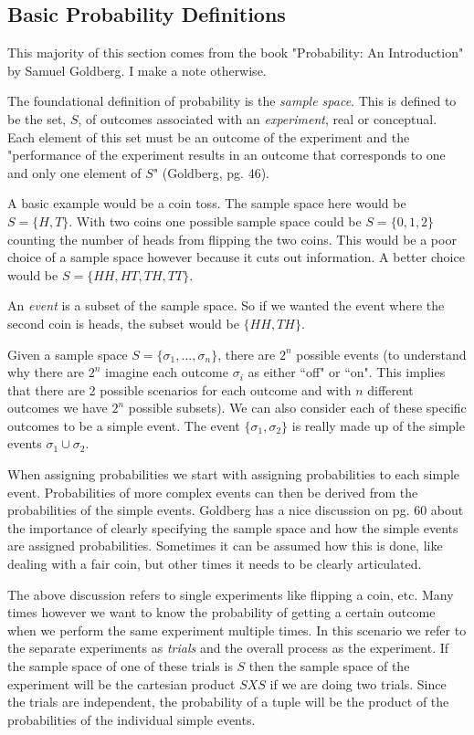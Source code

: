 \subsection{Basic Probability Definitions}

This majority of this section comes from the book "Probability: An Introduction" by Samuel Goldberg. I make a note otherwise.

The foundational definition of probability is the \emph{sample space}. This is defined to be the set, $S$, of outcomes associated with an \emph{experiment}, real or conceptual. Each element of this set must be an outcome of the experiment and the "performance of the experiment results in an outcome that corresponds to one and only one element of $S$" (Goldberg, pg. 46).

A basic example would be a coin toss. The sample space here would be $S = \{H,T\}$. With two coins one possible sample space could be $S=\{0,1,2\}$ counting the number of heads from flipping the two coins. This would be a poor choice of a sample space however because it cuts out information. A better choice would be $S=\{HH, HT, TH, TT\}$.

An \emph{event} is a subset of the sample space. So if we wanted the event where the second coin is heads, the subset would be $\{HH, TH\}$.

Given a sample space $S=\{\sigma_1, ..., \sigma_n\}$, there are $2^n$ possible events (to understand why there are $2^n$ imagine each outcome $\sigma_i$ as either ``off" or ``on". This implies that there are 2 possible scenarios for each outcome and with $n$ different outcomes we have $2^n$ possible subsets). We can also consider each of these specific outcomes to be a simple event. The event $\{\sigma_1, \sigma_2\}$ is really made up of the simple events ${\sigma_1} \cup {\sigma_2}$. 

When assigning probabilities we start with assigning probabilities to each simple event. Probabilities of more complex events can then be derived from the probabilities of the simple events. Goldberg has a nice discussion on pg. 60 about the importance of clearly specifying the sample space and how the simple events are assigned probabilities. Sometimes it can be assumed how this is done, like dealing with a fair coin, but other times it needs to be clearly articulated.

The above discussion refers to single experiments like flipping a coin, etc. Many times however we want to know the probability of getting a certain outcome when we perform the same experiment multiple times. In this scenario we refer to the separate experiments as \emph{trials} and the overall process as the experiment. If the sample space of one of these trials is $S$ then the sample space of the experiment will be the cartesian product $SXS$ if we are doing two trials. Since the trials are independent, the probability of a tuple will be the product of the probabilities of the individual simple events. 

